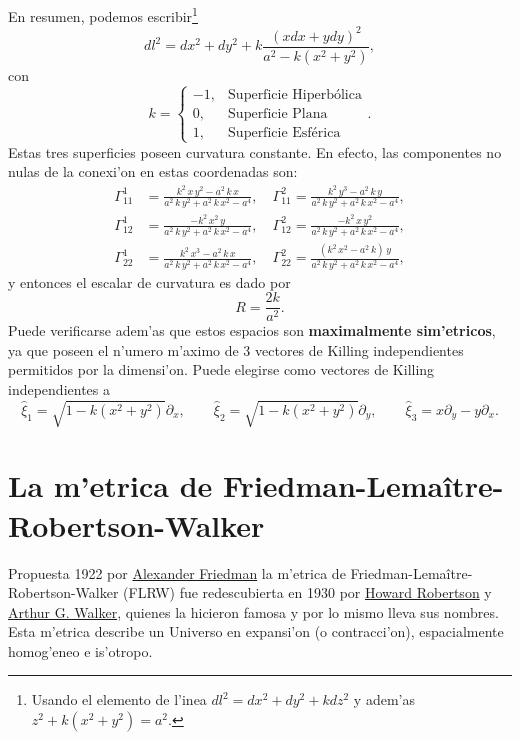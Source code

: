 En resumen, podemos escribir\footnote{Usando el elemento de l'inea $dl^{2}= dx^{2} + dy^{2} + kdz^{2}$ y adem'as $z^2 +k(x^2 + y^2)=a^2$.}
\begin{equation}
dl^{2}= dx^{2} + dy^{2} + k\frac{(xdx + ydy)^{2}}{a^2-k(x^2 + y^2)},\label{60j}
\end{equation}
con
\begin{equation}
k=\left\{\begin{array}{rl}
-1,& \mbox{Superficie Hiperb\'olica}\\ \label{61j}
0,& \mbox{Superficie Plana}\\
1,& \mbox{Superficie Esf\'erica}
\end{array}\right. .
\end{equation}
Estas tres superficies poseen curvatura constante. En efecto, las componentes no nulas de la conexi'on en estas coordenadas son:
\begin{align}
\Gamma^{1}_{11} &= \frac{{k}^{2}\,x\,{y}^{2}-a^{2}\,k\,x}{a^{2}\,k\,{y}^{2}+a^{2}\,k\,{x}^{2}-a^{4}}, \quad
\Gamma^{2}_{11}=\frac{{k}^{2}\,{y}^{3}-a^{2}\,k\,y}{a^{2}\,k\,{y}^{2}+a^{2}\,k\,{x}^{2}-a^{4}}, \\
\Gamma^{1}_{12} &= \frac{-{k}^{2}\,{x}^{2}\,y}{a^{2}\,k\,{y}^{2}+a^{2}\,k\,{x}^{2}-a^{4}},\quad
\Gamma^{2}_{12}=\frac{-{k}^{2}\,x\,{y}^{2}}{a^{2}\,k\,{y}^{2}+a^{2}\,k\,{x}^{2}-a^{4}},\\
\Gamma^{1}_{22} &= \frac{{k}^{2}\,{x}^{3}-a^{2}\,k\,x}{a^{2}\,k\,{y}^{2}+a^{2}\,k\,{x}^{2}-a^{4}}, \quad
\Gamma^{2}_{22}=\frac{\left( {k}^{2}\,{x}^{2}-a^{2}\,k\right) \,y}{a^{2}\,k\,{y}^{2}+a^{2}\,k\,{x}^{2}-a^{4}},
\end{align}
y entonces el escalar de curvatura es dado por
\begin{equation}
R=\frac{2k}{a^2}.
\end{equation}
Puede verificarse adem'as que estos espacios son \textbf{maximalmente sim'etricos}, ya que poseen el n'umero m'aximo de 3 vectores de Killing independientes permitidos por la dimensi'on.
Puede elegirse como vectores de Killing independientes a
\begin{equation}
\hat{\xi}_{1}=\sqrt{1-k(x^2+y^2)}\partial_x, \qquad \hat{\xi}_{2}=\sqrt{1-k(x^2+y^2)}\partial_y, \qquad \hat{\xi}_{3} = x\partial_y -y\partial_x.
\end{equation}

\section{La m'etrica de Friedman-Lema\^itre-Robertson-Walker}
Propuesta 1922 por \href{http://es.wikipedia.org/wiki/Aleksandr_Fridman}{Alexander Friedman} la m'etrica de Friedman-Lema\^itre-Robertson-Walker (FLRW) fue redescubierta en 1930 por \href{http://en.wikipedia.org/wiki/Howard_P._Robertson}{Howard Robertson} y \href{http://en.wikipedia.org/wiki/Arthur_Geoffrey_Walker}{Arthur G. Walker}, quienes la hicieron famosa y por lo mismo lleva sus nombres. Esta m'etrica describe un Universo en expansi'on (o contracci'on), espacialmente homog'eneo e is'otropo.


